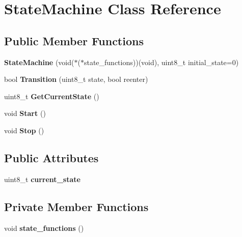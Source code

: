\hypertarget{class_state_machine}{}\section{State\+Machine Class Reference}
\label{class_state_machine}
\subsection*{Public Member Functions}
\begin{DoxyCompactItemize}
\item 
\hypertarget{class_state_machine_ad9c6bdaca444710f77fc12d7e1af8fdc}{}\label{class_state_machine_ad9c6bdaca444710f77fc12d7e1af8fdc} 
{\bfseries State\+Machine} (void($\ast$($\ast$state\+\_\+functions))(void), uint8\+\_\+t initial\+\_\+state=0)
\item 
\hypertarget{class_state_machine_a1597799edc5a89006f164e52fd72d02b}{}\label{class_state_machine_a1597799edc5a89006f164e52fd72d02b} 
bool {\bfseries Transition} (uint8\+\_\+t state, bool reenter)
\item 
\hypertarget{class_state_machine_a62fd24666d16a2425c8397ce2d326dae}{}\label{class_state_machine_a62fd24666d16a2425c8397ce2d326dae} 
uint8\+\_\+t {\bfseries Get\+Current\+State} ()
\item 
\hypertarget{class_state_machine_a94c93f8203bab4f5a3784eba7445b582}{}\label{class_state_machine_a94c93f8203bab4f5a3784eba7445b582} 
void {\bfseries Start} ()
\item 
\hypertarget{class_state_machine_a2eb142249e4c483c8a329b1a18b4383f}{}\label{class_state_machine_a2eb142249e4c483c8a329b1a18b4383f} 
void {\bfseries Stop} ()
\end{DoxyCompactItemize}
\subsection*{Public Attributes}
\begin{DoxyCompactItemize}
\item 
\hypertarget{class_state_machine_abdcd9426d9a2ec9e2d703c74cd3299df}{}\label{class_state_machine_abdcd9426d9a2ec9e2d703c74cd3299df} 
uint8\+\_\+t {\bfseries current\+\_\+state}
\end{DoxyCompactItemize}
\subsection*{Private Member Functions}
\begin{DoxyCompactItemize}
\item 
\hypertarget{class_state_machine_acc87359cd98c436f5b891ffe6cb67160}{}\label{class_state_machine_acc87359cd98c436f5b891ffe6cb67160} 
void {\bfseries state\+\_\+functions} ()
\end{DoxyCompactItemize}
